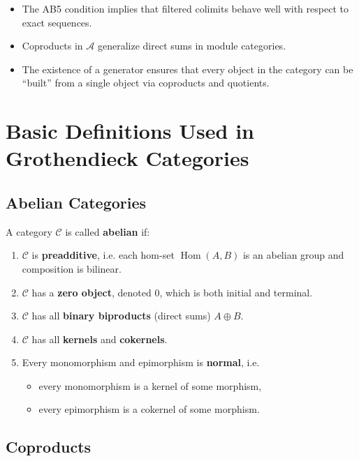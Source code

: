 \begin{itemize}
    \item The AB5 condition implies that filtered colimits behave well with respect to exact sequences.

    \item Coproducts in $\mathcal{A}$ generalize direct sums in module categories.

    \item The existence of a generator ensures that every object in the category can be ``built'' from a single object via coproducts and quotients.
\end{itemize}

\section{Basic Definitions Used in Grothendieck Categories}

\subsection{Abelian Categories}

A category $\mathcal{C}$ is called \textbf{abelian} if:

\begin{enumerate}
    \item $\mathcal{C}$ is \textbf{preadditive}, i.e. each hom-set $\operatorname{Hom}(A,B)$ is an abelian group and composition is bilinear.

    \item $\mathcal{C}$ has a \textbf{zero object}, denoted $0$, which is both initial and terminal.

    \item $\mathcal{C}$ has all \textbf{binary biproducts} (direct sums) $A \oplus B$.

    \item $\mathcal{C}$ has all \textbf{kernels} and \textbf{cokernels}.

    \item Every monomorphism and epimorphism is \textbf{normal}, i.e.
    \begin{itemize}
        \item every monomorphism is a kernel of some morphism,
        \item every epimorphism is a cokernel of some morphism.
    \end{itemize}
\end{enumerate}

\subsection{Coproducts}

